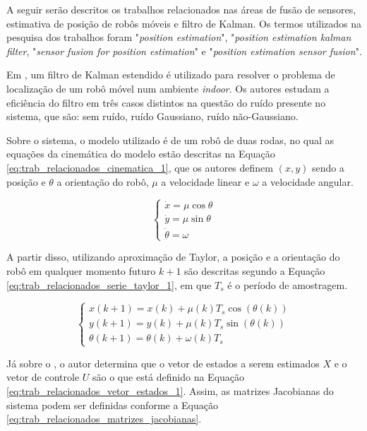 \documentclass[acronym, symbols, table, deposito]{fei}
\begin{document}
A seguir serão descritos os trabalhos relacionados nas áreas de fusão de sensores, estimativa de posição de robôs móveis e filtro de Kalman. Os termos utilizados na pesquisa dos trabalhos foram "\textit{position estimation}", "\textit{position estimation kalman filter}, "\textit{sensor fusion for position estimation}" e "\textit{position estimation sensor fusion}".

Em \textcite{eman2020mobile}, um filtro de Kalman estendido é utilizado para resolver o problema de localização de um robô móvel num ambiente \textit{indoor}. Os autores estudam a eficiência do filtro em três casos distintos na questão do ruído presente no sistema, que são: sem ruído, ruído Gaussiano, ruído não-Gaussiano.

Sobre o sistema, o modelo utilizado é de um robô de duas rodas, no qual as equações da cinemática do modelo estão descritas na Equação \eqref{eq:trab_relacionados_cinematica_1}, que os autores definem $(x, y)$ sendo a posição e $\theta$ a orientação do robô, $\mu$ a velocidade linear e $\omega$ a velocidade angular.

\begin{equation}\label{eq:trab_relacionados_cinematica_1}
	\begin{cases}
		\dot{x} = \mu \cos{\theta} \\
		\dot{y} = \mu \sin{\theta} \\
		\dot{\theta} = \omega
	\end{cases}
\end{equation}

A partir disso, utilizando aproximação de Taylor, a posição e a orientação do robô em qualquer momento futuro $k + 1$ são descritas segundo a Equação \eqref{eq:trab_relacionados_serie_taylor_1}, em que $T_s$ é o período de amostragem.

\begin{equation} \label{eq:trab_relacionados_serie_taylor_1}
	\begin{cases*}
		x(k+1) = x(k) + \mu(k)T_s\cos{(\theta(k))} \\
		y(k+1) = y(k) + \mu(k)T_s\sin{(\theta(k))} \\
		\theta(k+1) = \theta(k) + \omega(k)T_s
	\end{cases*}
\end{equation}

Já sobre o , o autor determina que o vetor de estados a serem estimados $X$ e o vetor de controle $U$ são o que está definido na Equação \eqref{eq:trab_relacionados_vetor_estados_1}. Assim, as matrizes Jacobianas do sistema podem ser definidas conforme a Equação \eqref{eq:trab_relacionados_matrizes_jacobianas}.
\end{document}
